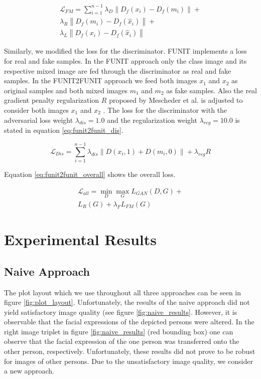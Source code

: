 \documentclass[conference]{IEEEtran}
\begin{document}
\begin{equation}
\begin{split}
	\mathcal{L}_{FM} = \sum_{i=1}^{n-1} \lambda_{D} \left\| D_f(x_i) - D_f(m_i) \right\| + \\
	 \lambda_{R} \left\| D_f(m_i) - D_f(\hat{x}_i) \right\| + \\ \lambda_{L} \left\| D_f(x_i) - D_f(\hat{x}_i) \right\| 
	\label{eq:funit2funit_fm}
\end{split}
\end{equation}

Similarly, we modified the loss for the discriminator. FUNIT implements a loss for real and fake samples. In the FUNIT approach only the class image and its respective mixed image are fed through the discriminator as real and fake samples. In the FUNIT2FUNIT approach we feed both images $x_1$ and $x_2$ as original samples and both mixed images $m_1$ and $m_2$ as fake samples. Also the real gradient penalty regularization $R$ proposed by Mescheder et al. is adjusted to consider both images  $x_1$ and $x_2$ \cite{mescheder2018training}. The loss for the discriminator with the adversarial loss weight $\lambda_{dis}=1.0$ and the regularization weight $\lambda_{reg}=10.0$ is stated in equation \ref{eq:funit2funit_dis}.

\begin{equation}
	\mathcal{L}_{Dis} = \sum_{i=1}^{n-1} \lambda_{dis} \left\| D(x_i, 1) + D(m_i, 0) \right\| + \lambda_{reg} R
	\label{eq:funit2funit_dis}
\end{equation}

Equation \ref{eq:funit2funit_overall} shows the overall loss. 

\begin{equation}
\begin{split}
	 \mathcal{L}_{all} = \min_{D} \max_{G} {L}_{GAN}(D,G) + \\  L_R(G) + \lambda_F L_{FM}(G)
	\label{eq:funit2funit_overall}
\end{split}
\end{equation}

\label{chap5_results}
\section{Experimental Results}
\subsection{Naive Approach}

The plot layout which we use throughout all three approaches can be seen in figure \ref{fig:plot_layout}. Unfortunately, the results of the naive approach did not yield satisfactory image quality (see figure \ref{fig:naive_results}. However, it is observable that the facial expressions of the depicted persons were altered. In the right image triplet in figure \ref{fig:naive_results} (red bounding box) one can observe that the facial expression of the one person was transferred onto the other person, respectively. Unfortunately, these results did not prove to be robust for images of other persons. Due to the unsatisfactory image quality, we consider a new approach. 
\end{document}
